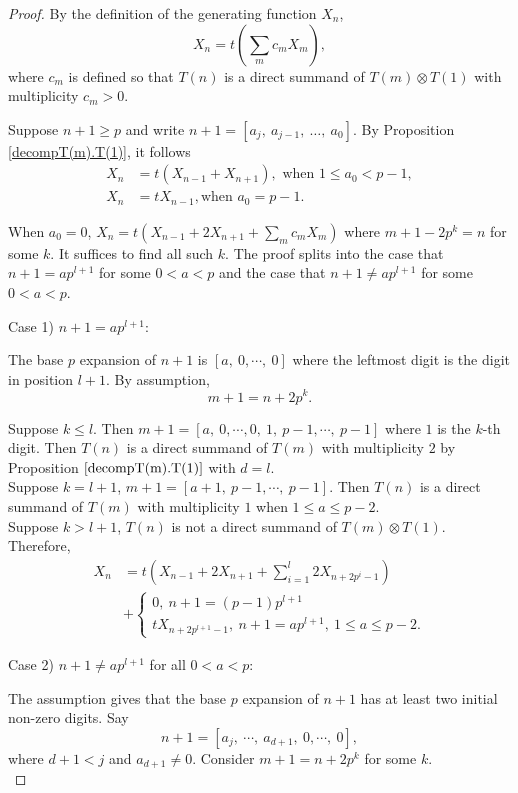 \documentclass[11 pt]{amsart}
\theoremstyle{plain}
\theoremstyle{definition}
\theoremstyle{remark}
\def\xx{\otimes}
\begin{document}
\begin{proof}
    
By the definition of the generating function $X_n$, $$X_n=t(\sum_m c_mX_m),$$ where $c_m$ is defined so that  $T(n)$ is a direct summand of $T(m)\xx T(1)$ with multiplicity $c_m>0$.

Suppose $n+1\ge p$ and write $n+1=[a_j,\ a_{j-1},\ \ldots,\ a_0].$
By Proposition \ref{decompT(m).T(1)}, it follows
\begin{align*}
    X_n&=t(X_{n-1}+X_{n+1}), \text{ when } 1 \le a_0 < p-1, \\
    X_n&=t X_{n-1}, \text{when } a_0=p-1.
\end{align*}

When $a_0=0$, $X_n=t( X_{n-1}+2X_{n+1}+\sum_m c_mX_m)$ where $m+1-2p^k=n$ for some $k$. It suffices to find all such $k$. The proof splits into the case that $n+1=ap^{l+1}$ for some $0<a<p$ and the case that $n+1 \neq ap^{l+1}$ for some $0<a<p$. 

Case 1) $n+1=ap^{l+1}$:  

The base $p$ expansion of $n+1$ is $[a,\ 0, \cdots, \ 0]$ where the leftmost digit is the digit in position $l+1$. By assumption, $$m+1=n+2p^k.$$

Suppose $k \le l$. Then $m+1=[a,\ 0, \cdots, 0,\ 1,\ p-1, \cdots, \ p-1]$ where $1$ is the $k$-th digit. Then $T(n)$ is a direct summand of $T(m)$ with multiplicity $2$ by Proposition $\ref{decompT(m).T(1)}$ with $d=l$.\\ 

Suppose $k=l+1$, $m+1=[a+1,\  p-1, \cdots, \ p-1]$. Then $T(n)$ is a direct summand of $T(m)$ with multiplicity $1$ when $1\le a \le p-2$.\\

Suppose $k>l+1$, $T(n)$ is not a direct summand of $T(m)\xx T(1)$.
\\

Therefore, 
\begin{align*}
    X_n&=t(X_{n-1}+2X_{n+1}+\sum_{i=1}^l 2X_{n+2p^i-1})\\
    &+\begin{cases}
        0,\ n+1=(p-1)p^{l+1}\\
        tX_{n+2p^{l+1}-1},\ n+1=ap^{l+1},\ 1\le a \le p-2.
\end{cases}
\end{align*}



Case 2) $n+1 \neq ap^{l+1}$ for all $0<a<p$:

The assumption gives that the base $p$ expansion of $n+1$ has at least two initial non-zero digits. Say $$n+1=[a_j,\ \cdots, \ a_{d+1},\ 0, \cdots, \ 0],$$ where $d+1<j$ and $a_{d+1}\neq0$. Consider $m+1=n+2p^k$ for some $k$.\\


\end{proof}
\end{document}
